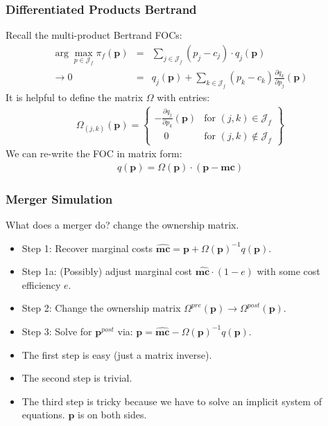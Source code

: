 \documentclass[xcolor=pdftex,dvipsnames,table,mathserif]{beamer}
\begin{document}
\begin{frame}
\frametitle{Differentiated Products Bertrand}
Recall the multi-product Bertrand FOCs:
\begin{eqnarray*}
\arg \max_{p \in \mathcal{J}_f} \pi_f (\mathbf{p}) &=& \sum_{j \in \mathcal{J}_f} (p_j - c_j) \cdot q_j(\mathbf{p}) \\
\rightarrow 0&=& q_j(\mathbf{p}) + \sum_{k \in \mathcal{J}_f} (p_k - c_k) \frac{\partial q_{k}}{\partial p_j}(\mathbf{p})
\end{eqnarray*}
It is helpful to define the matrix $\Omega$ with entries:
\begin{eqnarray*}
\Omega_{(j,k)}(\mathbf{p}) = \left\{\begin{array}{lr}
         - \frac{\partial q_{j}}{\partial p_k}(\mathbf{p}) & \text{for }  (j,k) \in \mathcal{J}_f\\
       	  \quad 0 & \text{for } (j,k) \notin \mathcal{J}_f
        \end{array} \right\}
\end{eqnarray*}
We can re-write the FOC in matrix form:
\begin{eqnarray*}
q(\mathbf{p}) = \Omega(\mathbf{p})\cdot(\mathbf{p}-\mathbf{mc})
\end{eqnarray*}
\end{frame}

\begin{frame}
\frametitle{Merger Simulation}
What does a merger do? \alert{change the ownership matrix}.
\begin{itemize}

\item Step 1: Recover marginal costs $\widehat{\mathbf{mc}} = \mathbf{p} +\Omega(\mathbf{p})^{-1}q(\mathbf{p})$.
\item Step 1a: (Possibly) adjust marginal cost $\widehat{\mathbf{mc}}\cdot (1-e)$ with some cost efficiency $e$.
\item Step 2: Change the ownership matrix $\Omega^{pre}(\mathbf{p}) \rightarrow \Omega^{post}(\mathbf{p})$.
\item Step 3: Solve for $\mathbf{p}^{post}$ via: $\mathbf{p} = \widehat{\mathbf{mc}} - \Omega(\mathbf{p})^{-1}q(\mathbf{p})$.
\end{itemize}
\pause
\vspace{0.5cm}
\begin{itemize}
\item The first step is easy (just a matrix inverse).
\item The second step is trivial.
\item The third step is tricky because we have to solve an implicit system of equations. $\mathbf{p}$ is on both sides.
\end{itemize}
\end{frame}
\end{document}
